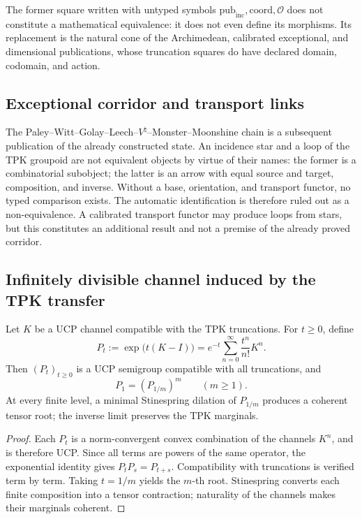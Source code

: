 The former square written with untyped symbols
\(\mathrm{pub}_{\mathrm{inc}},\mathrm{coord},\mathcal O\) does not constitute a
mathematical equivalence: it does not even define its morphisms. Its replacement is the
natural cone of the Archimedean, calibrated exceptional, and
dimensional publications, whose truncation squares do have declared domain, codomain, and
action.

\subsection{Exceptional corridor and transport links}

The Paley--Witt--Golay--Leech--\(V^{\natural}\)--Monster--Moonshine chain is a subsequent publication of the already constructed state. An incidence star and a loop of the TPK groupoid are not equivalent objects by virtue of their names: the former is a combinatorial subobject; the latter is an arrow with equal source and target, composition, and inverse. Without a base, orientation, and transport functor, no typed comparison exists. The automatic identification is therefore ruled out as a non-equivalence. A calibrated transport functor may produce loops from stars, but this constitutes an additional result and not a premise of the already proved corridor.

\subsection{Infinitely divisible channel induced by the TPK transfer}

\begin{theorem}
\label{thm:hmt-final-poissonizacion-ucp}
Let \(K\) be a UCP channel compatible with the TPK truncations\@. For \(t\ge0\),
define
\[
 P_t:=\exp\bigl(t(K-I)\bigr)
 =e^{-t}\sum_{n=0}^{\infty}\frac{t^n}{n!}K^n.
\]
Then \((P_t)_{t\ge0}\) is a UCP semigroup compatible with all
truncations, and
\[
 P_1=(P_{1/m})^m
 \qquad(m\ge1).
\]
At every finite level, a minimal Stinespring dilation of \(P_{1/m}\)
produces a coherent tensor root; the inverse limit preserves the
TPK marginals.
\end{theorem}

\begin{proof}
Each \(P_t\) is a norm-convergent convex combination of the channels
\(K^n\), and is therefore UCP\@. Since all terms are powers of the same
operator, the exponential identity gives \(P_tP_s=P_{t+s}\). Compatibility
with truncations is verified term by term. Taking \(t=1/m\) yields
the \(m\)-th root. Stinespring converts each finite composition into
a tensor contraction; naturality of the channels makes their
marginals coherent.
\end{proof}

